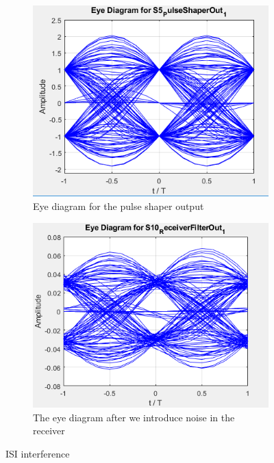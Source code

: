 \begin{figure}[H]
	\centering
	\begin{subfigure}{0.4\textwidth}
		\centering
		\includegraphics[scale=0.4]{./lib/m_qam_transmitter/figures/eye_no_noise.png}
		\caption{Eye diagram for the pulse shaper output}
		\label{fig:eye_clear}
	\end{subfigure}
	\begin{subfigure}{0.4\textwidth}
		\centering
		\includegraphics[scale=0.4]{./lib/m_qam_transmitter/figures/eye_noise.png}
		\caption{The eye diagram after we introduce noise in the receiver}
		\label{fig:eye_with_noise}
	\end{subfigure}
\caption{ISI interference}
\label{fig:eyes}
\end{figure}

